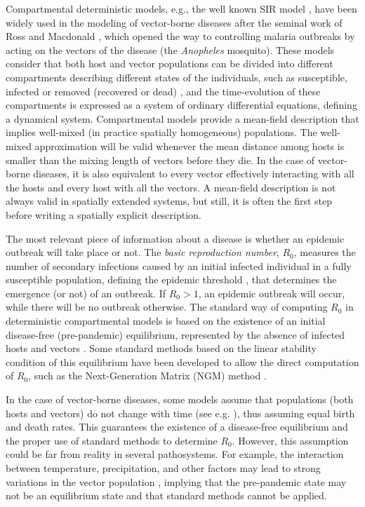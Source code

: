 Compartmental deterministic models, e.g., the well known SIR model
\cite{McKendrick}, have been widely used in the modeling of vector-borne
diseases after the seminal work of Ross and Macdonald \cite{Macdonald1957},
which opened the way to controlling malaria outbreaks by acting on the vectors
of the disease (the \textit{Anopheles} mosquito). These models consider that
both host and vector populations can be divided into different compartments
describing different states of the individuals, such as susceptible, infected
or removed (recovered or dead) \cite{Brauer2008}, and the time-evolution of
these compartments is expressed as a system of ordinary differential equations,
defining a dynamical system. Compartmental models provide a mean-field
description that implies well-mixed (in practice spatially homogeneous)
populations. The well-mixed approximation will be valid whenever the mean
distance among hosts is smaller than the mixing length of vectors before they
die. In the case of vector-borne diseases, it is also equivalent to every
vector effectively interacting with all the hosts and every host with all the
vectors. A mean-field description is not always valid in spatially extended
systems, but still, it is often the first step before writing a spatially
explicit description.

The most relevant piece of information about a disease is whether an
epidemic outbreak will take place or not. The \textit{basic reproduction
    number}, $R_0$, measures the number of secondary infections caused by an
initial infected individual in a fully susceptible population, defining the
epidemic threshold \cite{Anderson1991, VandenDriessche2017}, that determines
the emergence (or not) of an outbreak. If $R_0>1$, an epidemic outbreak will
occur, while there will be no outbreak otherwise. The standard way of computing
$R_0$ in deterministic compartmental models is based on the existence of an
initial disease-free (pre-pandemic) equilibrium, represented by the absence of
infected hosts and vectors \cite{Lauko2006, Kamgang2008}. Some standard
methods based on the linear stability condition of this equilibrium have been
developed to allow the direct computation of $R_0$, such as the Next-Generation
Matrix (NGM) method \cite{Diekmann2010}.

In the case of vector-borne diseases, some models assume that populations
(both hosts and vectors) do not change with time (see e.g.
\cite{Macdonald1957, Brauer2016, VandenBosch2017}), thus assuming equal birth
and death rates. This guarantees the existence of a disease-free equilibrium
and the proper use of standard methods to determine $R_0$. However, this
assumption could be far from reality in several pathosystems. For example, the
interaction between temperature, precipitation, and other factors may lead to
strong variations in the vector population \cite{garms1979studies,Rocklov2020},
implying that the pre-pandemic state may not be an equilibrium state and that
standard methods cannot be applied.

